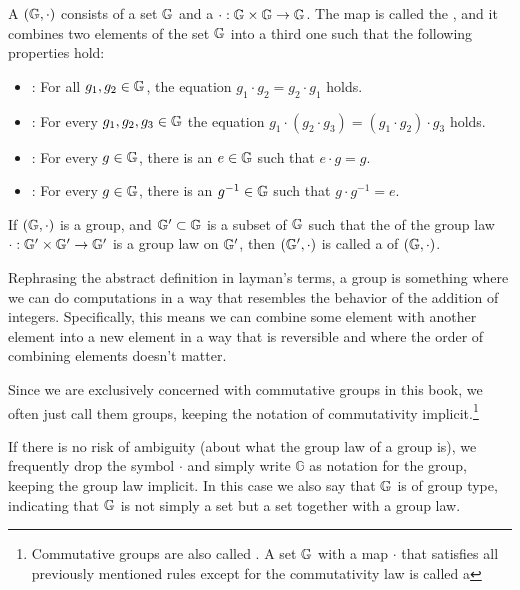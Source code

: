 
\begin{definition}
\label{def:commutative_group}
A  $(\mathbb{G},\cdot) $ consists of a set $\mathbb{G}$ and a  $\cdot:\mathbb{G} \times \mathbb{G} \to \mathbb{G} $. The map is called the , and it combines two elements of the set $ \mathbb{G}$ into a third one such that the following properties hold:
\begin{itemize}
\item {}: For all $g_1,g_2\in\mathbb{G}$, the equation $g_1\cdot g_2=g_2\cdot g_1$ holds.
\item {}: For every $g_1,g_2,g_3\in\mathbb{G}$ the equation
$g_1\cdot(g_2\cdot g_3) = (g_1\cdot g_2)\cdot g_3$ holds.
\item {}:  For every $g\in\mathbb{G}$, there is an $e\in\mathbb{G}$ such that $e\cdot g=g$.
\item {}: For every $g\in\mathbb{G}$, there is an $g^{-1}\in\mathbb{G}$ such that $g\cdot g^{-1}=e$.
\end{itemize}
If $(\mathbb{G},\cdot)$ is a group, and $\mathbb{G}'\subset\mathbb{G}$ is a subset of $\mathbb{G}$ such that the  of the group law $\cdot: \mathbb{G}'\times \mathbb{G}' \to \mathbb{G}'$ is a group law on $\mathbb{G}'$, then $(\mathbb{G}',\cdot)$ is called a  of $(\mathbb{G},\cdot)$.
\end{definition}

Rephrasing the abstract definition in layman's terms, a group is something where we can do computations in a way that resembles the behavior of the addition of integers. Specifically, this means we can combine some element with another element into a new element in a way that is reversible and where the order of combining elements doesn't matter.

\begin{notation}Since we are exclusively concerned with commutative groups in this book, we often just call them groups, keeping the notation of commutativity implicit.\footnote{Commutative groups are also called . A set $\mathbb{G}$ with a map $\cdot$ that satisfies all previously mentioned rules except for the commutativity law is called a } 

If there is no risk of ambiguity (about what the group law of a group is), we frequently drop the symbol $\cdot$ and simply write $\mathbb{G}$ as notation for the group, keeping the group law implicit. In this case we also say that $\mathbb{G}$ is of group type, indicating that $\mathbb{G}$ is not simply a set but a set together with a group law.
\end{notation}

